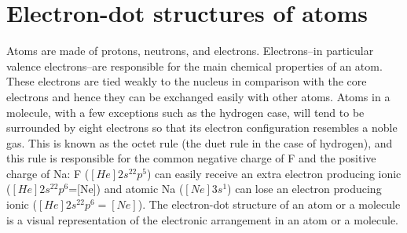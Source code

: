\documentclass[main.tex]{subfiles}
\begin{document}
\section{Electron-dot structures of atoms}
Atoms are made of protons, neutrons, and electrons. Electrons--in particular valence electrons--are responsible for the main chemical properties of an atom. These electrons are tied weakly to the nucleus in comparison with the core electrons and hence they can be exchanged easily with other atoms. Atoms in a molecule, with a few exceptions such as the hydrogen case, will tend to be surrounded by eight electrons so that its electron configuration resembles a noble gas. This is known as the octet rule (the duet rule in the case of hydrogen), and this rule is responsible for the common negative charge of F and the positive charge of Na: F ($[He]2s^22p^5$) can easily receive an extra electron producing ionic  ($[He]2s^22p^6$=[Ne]) and atomic Na ($[Ne]3s^1$) can lose an electron producing ionic  ($[He]2s^22p^6=[Ne]$). The electron-dot structure of an atom or a molecule is a visual representation of the electronic arrangement in an atom or a molecule. 

\sloppy 

	
	

	
	
\end{document}

